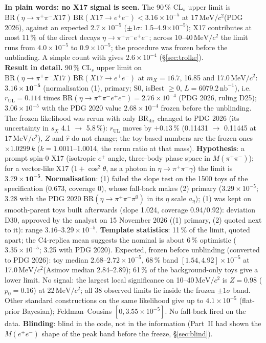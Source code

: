 \documentclass[11pt,a4paper]{article}
\newcommand{\piz}{\ensuremath{\pi^{0}}\xspace}
\newcommand{\ee}{\ensuremath{e^{+}e^{-}}\xspace}
\newcommand{\pipi}{\ensuremath{\pi^{+}\pi^{-}}\xspace}
\newcommand{\ppee}{\ensuremath{\pi^{+}\pi^{-}e^{+}e^{-}}\xspace}
\newcommand{\Mee}{\ensuremath{M(e^{+}e^{-})}\xspace}
\newcommand{\Mpipi}{\ensuremath{M(\pi^{+}\pi^{-})}\xspace}
\newcommand{\nbinv}{\ensuremath{\mathrm{nb}^{-1}}\xspace}
\newcommand{\MeVcc}{\ensuremath{\mathrm{MeV}/c^{2}}\xspace}
\newcommand{\code}[1]{\texttt{\detokenize{#1}}}
\newcommand{\aEta}{\ensuremath{a_\eta}\xspace}
\newcommand{\BRX}{\ensuremath{\mathrm{BR}(\eta\to\pipi X17)\,\mathrm{BR}(X17\to\ee)}\xspace}
\newcommand{\notebox}[1]{\par\noindent\colorbox{orange!10}{\parbox{\dimexpr\linewidth-2\fboxsep\relax}{#1}}\par}
\begin{document}
\notebox{\textbf{In plain words: no X17 signal is seen.} The 90\,\% CL$_s$ upper limit is $\BRX<3.16\times10^{-5}$ at 17\,\MeVcc (PDG 2026), against an
expected $2.7\times10^{-5}$ ($\pm1\sigma$: 1.5--4.9$\times10^{-5}$); X17 contributes at most 11\,\% of the direct decays $\eta\to\ppee$; across
10--40\,\MeVcc the limit runs from $4.0\times10^{-5}$ to $0.9\times10^{-5}$; the procedure was frozen before the unblinding. A simple count with
\code{TRolke} gives $2.6\times10^{-4}$ (\S\ref{sec:trolke}).\\[0.4em]
\textbf{Result in detail.} 90\,\% CL$_s$ upper limit on \BRX at $m_X=16.7$, 16.85 and 17.0\,\MeVcc: $\mathbf{3.16\times10^{-5}}$ (normalisation
(1), primary; S0, isBest $\ge0$, $L=6079.2\,\nbinv$), i.e.\ $r_{\mathrm{UL}}=0.114$ times BR$(\eta\to\ppee)=2.76\times10^{-4}$ (PDG 2026, ruling D25);
$3.06\times10^{-5}$ with the PDG 2020 value $2.68\times10^{-4}$ frozen before the unblinding. The frozen likelihood was rerun with only BR$_{\mathrm{dir}}$
changed to PDG 2026 (its uncertainty in $s_X$ 4.1 $\to$ 5.8\,\%): $r_{\mathrm{UL}}$ moves by $+0.13$\,\% (0.11431 $\to$ 0.11445 at 17\,\MeVcc), $Z$ and
$\hat r$ do not change; the toy-based numbers are the frozen ones $\times1.0299\,k$ ($k=1.0011$--1.0014, the rerun ratio at that mass). \textbf{Hypothesis}: a prompt spin-0 X17 (isotropic $e^+$ angle, three-body phase
space in \Mpipi); for a vector-like X17 ($1+\cos^2\theta$, as a photon in $\eta\to\pipi\gamma$) the limit is $\mathbf{3.79\times10^{-5}}$.
\textbf{Normalisation}: (1) failed the slope test on the 1500 toys of the specification (0.673, coverage 0), whose fall-back makes (2) primary
($3.29\times10^{-5}$; 3.28 with the PDG 2020 BR$(\eta\to\pipi\piz)$ in its $\eta$ scale \aEta); (1) was kept on smooth-parent toys built afterwards (slope 1.024, coverage 0.94/0.92): deviation D30, approved by the analyst on 15 November 2026 ((1) primary, (2) quoted next to it): range
$3.16$--$3.29\times10^{-5}$. \textbf{Template statistics}: 11\,\% of the limit, quoted apart; the C4-replica mean suggests the nominal is about
6\,\% optimistic ($3.35\times10^{-5}$; 3.25 with PDG 2020). Expected, frozen before unblinding (converted to PDG 2026): toy median $2.68$--$2.72\times10^{-5}$,
68\,\% band $[1.54,4.92]\times10^{-5}$ at 17.0\,\MeVcc (Asimov median 2.84--2.89); 61\,\% of the background-only toys give a lower limit. No
signal: the largest local significance on 10--40\,\MeVcc is $Z=0.98$ ($p_0=0.16$) at 22\,\MeVcc; all 38 observed limits lie inside the frozen
$\pm1\sigma$ band. Other standard constructions on the same likelihood give up to $4.1\times10^{-5}$ (flat-prior Bayesian); Feldman--Cousins
$[0,3.55\times10^{-5}]$. No fall-back fired on the data. \textbf{Blinding}: blind in the code, not in the information (Part~II had shown the
\Mee shape of the peak band before the freeze, \S\ref{sec:blind}).}
\end{document}
